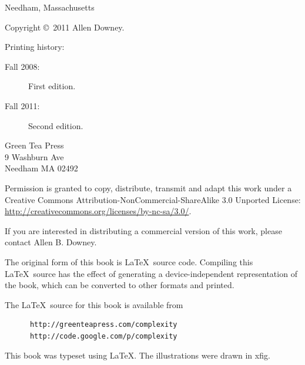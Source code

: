 \documentclass[10pt]{book}
\begin{document}
\begin{latexonly}
\begin{flushright}
{\small Needham, Massachusetts}

\vfill

\end{flushright}


\pagebreak
\thispagestyle{empty}

{\small
Copyright \copyright ~2011 Allen Downey.


Printing history:

\begin{description}

\item[Fall 2008:] First edition.

\item[Fall 2011:] Second edition.

\end{description}

\vspace{0.2in}

\begin{flushleft}
Green Tea Press       \\
9 Washburn Ave \\
Needham MA 02492
\end{flushleft}

Permission is granted to copy, distribute, transmit and adapt
this work under a Creative Commons 
Attribution-NonCommercial-ShareAlike 3.0 Unported License:
\url{http://creativecommons.org/licenses/by-nc-sa/3.0/}.

If you are interested in distributing a commercial version of this
work, please contact Allen B. Downey.

The original form of this book is \LaTeX\ source code.  Compiling this
\LaTeX\ source has the effect of generating a device-independent
representation of the book, which can be converted to other formats
and printed.

The \LaTeX\ source for this book is available from

\begin{verbatim}
      http://greenteapress.com/complexity
      http://code.google.com/p/complexity
\end{verbatim}

This book was typeset using \LaTeX .  The illustrations were
drawn in xfig.

\vspace{0.2in}

} %

\end{latexonly}
\end{document}

